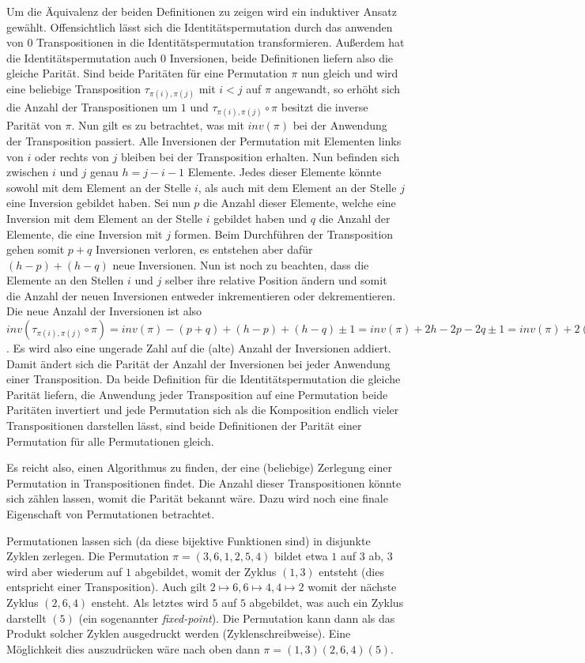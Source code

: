 \documentclass{whswinvcbook}
\begin{document}
Um die Äquivalenz der beiden Definitionen zu zeigen wird ein induktiver Ansatz gewählt. Offensichtlich lässt sich die Identitätspermutation durch das anwenden von $0$ Transpositionen in die Identitätspermutation transformieren. Außerdem hat die Identitätspermutation auch $0$ Inversionen, beide Definitionen liefern also die gleiche Parität. Sind beide Paritäten für eine Permutation $\pi$ nun gleich und wird eine beliebige Transposition $\tau_{\pi(i),\pi(j)}$ mit $i<j$ auf $\pi$ angewandt, so erhöht sich die Anzahl der Transpositionen um $1$ und $\tau_{\pi(i),\pi(j)}\circ\pi$ besitzt die inverse Parität von $\pi$. Nun gilt es zu betrachtet, was mit $inv(\pi)$ bei der Anwendung der Transposition passiert. Alle Inversionen der Permutation mit Elementen links von $i$ oder rechts von $j$ bleiben bei der Transposition erhalten. Nun befinden sich zwischen $i$ und $j$ genau $h=j-i-1$ Elemente. Jedes dieser Elemente könnte sowohl mit dem Element an der Stelle $i$, als auch mit dem Element an der Stelle $j$ eine Inversion gebildet haben. Sei nun $p$ die Anzahl dieser Elemente, welche eine Inversion mit dem Element an der Stelle $i$ gebildet haben und $q$ die Anzahl der Elemente, die eine Inversion mit $j$ formen. Beim Durchführen der Transposition gehen somit $p+q$ Inversionen verloren, es entstehen aber dafür $(h-p)+(h-q)$ neue Inversionen. Nun ist noch zu beachten, dass die Elemente an den Stellen $i$ und $j$ selber ihre relative Position ändern und somit die Anzahl der neuen Inversionen entweder inkrementieren oder dekrementieren. Die neue Anzahl der Inversionen ist also $inv(\tau_{\pi(i),\pi(j)}\circ\pi)=inv(\pi)-(p+q)+(h-p)+(h-q)\pm1=inv(\pi)+2h-2p-2q\pm1=inv(\pi)+2(h-p-q)\pm1$. Es wird also eine ungerade Zahl auf die (alte) Anzahl der Inversionen addiert. Damit ändert sich die Parität der Anzahl der Inversionen bei jeder Anwendung einer Transposition. Da beide Definition für die Identitätspermutation die gleiche Parität liefern, die Anwendung jeder Transposition auf eine Permutation beide Paritäten invertiert und jede Permutation sich als die Komposition endlich vieler Transpositionen darstellen lässt, sind beide Definitionen der Parität einer Permutation für alle Permutationen gleich.

Es reicht also, einen Algorithmus zu finden, der eine (beliebige) Zerlegung einer Permutation in Transpositionen findet. Die Anzahl dieser Transpositionen könnte sich zählen lassen, womit die Parität bekannt wäre. Dazu wird noch eine finale Eigenschaft von Permutationen betrachtet.

Permutationen lassen sich (da diese bijektive Funktionen sind) in disjunkte Zyklen zerlegen. Die Permutation $\pi=(3,6,1,2,5,4)$ bildet etwa $1$ auf $3$ ab, $3$ wird aber wiederum auf $1$ abgebildet, womit der Zyklus $(1,3)$ entsteht (dies entspricht einer Transposition). Auch gilt $2\mapsto6,6\mapsto4,4\mapsto2$ womit der nächste Zyklus $(2,6,4)$ ensteht. Als letztes wird $5$ auf $5$ abgebildet, was auch ein Zyklus darstellt $(5)$ (ein sogenannter \textit{fixed-point}). Die Permutation kann dann als das Produkt solcher Zyklen ausgedruckt werden (Zyklenschreibweise). Eine Möglichkeit dies auszudrücken wäre nach oben dann $\pi=(1,3)(2,6,4)(5)$.
\end{document}
